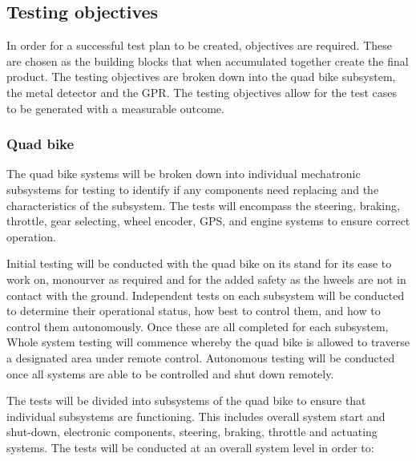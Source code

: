 \documentclass[main.tex]{subfiles}
\begin{document}
\begin{appendices}
\subsection{Testing objectives}
In order for a successful test plan to be created, objectives are required. These are chosen as the building blocks that when accumulated together create the final product. The testing objectives are broken down into the quad bike subsystem, the metal detector and the GPR. The testing objectives allow for the test cases to be generated with a measurable outcome.

\subsubsection{Quad bike}
The quad bike systems will be broken down into individual mechatronic subsystems for testing to identify if any components need replacing and the characteristics of the subsystem. The tests will encompass the steering, braking, throttle, gear selecting, wheel encoder, GPS, and engine systems to ensure correct operation.

\medskip\noindent
Initial testing will be conducted with the quad bike on its stand for its ease to work on, monourver as required and for the added safety as the hweels are not in contact with the ground. Independent tests on each subsystem will be conducted to determine their operational status, how best to control them, and how to control them autonomously. Once these are all completed for each subsystem, Whole system testing will commence whereby the quad bike is allowed to traverse a designated area under remote control. Autonomous testing will be conducted once all systems are able to be controlled and shut down remotely.

\medskip\noindent
The tests will be divided into subsystems of the quad bike to ensure that individual subsystems are functioning. This includes overall system start and shut-down, electronic components, steering, braking, throttle and actuating systems. The tests will be conducted at an overall system level in order to:


\end{appendices}
\end{document}
